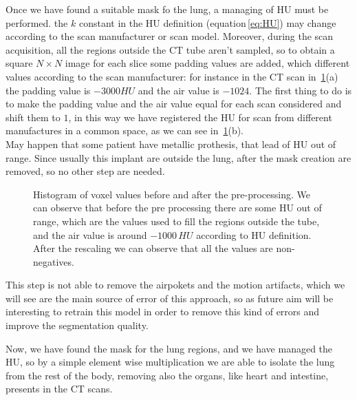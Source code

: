 \documentclass{standalone}
\begin{document}
	Once we have found a suitable mask fo the lung, a managing of HU must be performed. the $k$ constant in the HU definition (equation\,\ref{eq:HU}) may change according to the scan manufacturer or scan model. Moreover, during the scan acquisition, all the regions outside the CT tube aren't sampled, so to obtain a square $N\times N$ image for each slice some padding values are added, which different values according to the scan manufacturer: for instance in the CT scan in \figurename\,\ref{fig:Pre-Processing}(a) the padding value is $-3000 HU$ and the air value is $-1024$. The first thing to do is to make the padding value and the air value equal for each scan considered and shift them to $1$, in this way we have registered the HU for scan from different manufactures in a common space, as we can see in \figurename\,\ref{fig:Pre-Processing}(b).\\ May happen that some patient have metallic prothesis, that lead of HU out of range. Since usually this implant are outside the lung, after the mask creation are removed, so no other step are needed.\\
		\begin{figure}[h]
		\centering
		\caption{Histogram of voxel values before and after the pre-processing. We can observe that before the pre processing there are some HU out of range, which are the values used to fill the regions outside the tube, and the air value is around $-1000\,HU$ according to HU definition. After the rescaling we can observe that all the values are non-negatives.}\label{fig:Pre-Processing}
	\end{figure}

	This step is not able to remove the airpokets and the motion artifacts, which we will see are the main source of error of this approach, so as future aim will be interesting to retrain this model in order to remove this kind of errors and improve the segmentation  quality.
	
	Now, we have found the mask for the lung regions, and we have managed the HU, so by a simple element wise multiplication we are able to isolate the lung from the rest of the body, removing also the organs, like heart and intestine, presents in the CT scans.\\
	
\end{document}
